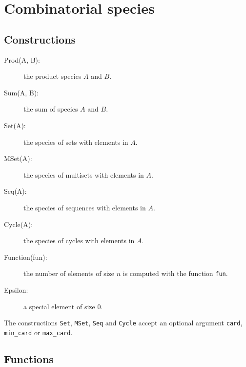 \documentclass[11pt]{article}
\begin{document}
\section{Combinatorial species}

\subsection{Constructions}
\begin{description}
  \item[Prod(A, B):] the product species $A$ and $B$.
  \item[Sum(A, B):] the sum of species $A$ and $B$.
  \item[Set(A):] the species of sets with elements in $A$.
  \item[MSet(A):] the species of multisets with elements in $A$.
  \item[Seq(A):] the species of sequences with elements in $A$.
  \item[Cycle(A):] the species of cycles with elements in $A$.
  \item[Function(fun):] the number of elements of size $n$ is computed
    with the function \texttt{fun}.
  \item[Epsilon:] a special element of size 0.
\end{description}
%
The constructions \texttt{Set}, \texttt{MSet}, \texttt{Seq} and
\texttt{Cycle} accept an optional argument \texttt{card},
\texttt{min\_card} or \texttt{max\_card}.

\subsection{Functions}
\end{document}
